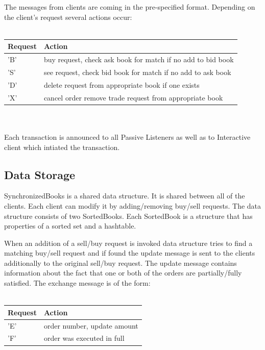 \documentclass[11pt]{article}
\begin{document}
The messages from clients are coming in the pre-specified format. Depending on the client's request several actions occur:
\\
\\
\begin{tabular}{|l|l|}
  \hline
  Request & Action \\ \hline
  'B' & buy request, check ask book for match if no add to bid book \\ \hline
  'S' & see request, check bid book for match if no add to ask book \\ \hline
  'D' & delete request from appropriate book if one exists \\ \hline
  'X' & cancel order remove trade request from appropriate book\\
  \hline
\end{tabular}
\\
\\
Each transaction is announced to all Passive Listeners as well as to Interactive client which intiated the transaction. 


\subsection{Data Storage}
SynchronizedBooks is a shared data structure. It is shared between all of the clients. Each client can modify it by adding/removing buy/sell requests. The data structure consists of two SortedBooks. Each SortedBook is a structure that has properties of a sorted set and a hashtable. 

When an addition of a sell/buy request is invoked data structure tries to find a matching buy/sell request and if found the update message is sent to the clients additionally to the original sell/buy request. The update message contains information about the fact that one or both of the orders are partially/fully satisfied. The exchange message is of the form:
\\
\\
\begin{tabular}{|l|l|}
  \hline
  Request & Action \\ \hline
  'E' & order number, update amount \\ \hline
  'F' & order was executed in full \\

  \hline
\end{tabular}
\\
\end{document}
